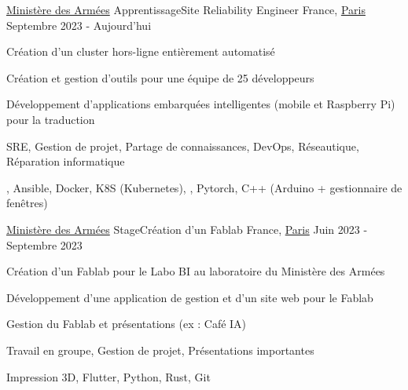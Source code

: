

\begin{cventries}

	\cventry
	{\href{https://www.defense.gouv.fr/}{Ministère des Armées}}
	{Apprentissage{\enskip\cdotp\enskip}Site Reliability Engineer} %
	{France, \href{https://www.paris.fr/}{Paris}} %
	{Septembre 2023 - Aujourd'hui} %
	{
		\begin{cvitems} %
			\item {Création d'un cluster hors-ligne entièrement automatisé}
			\item {Création et gestion d'outils pour une équipe de 25 développeurs}
			\item {Développement d'applications embarquées intelligentes (mobile et Raspberry Pi) pour la traduction}
		\end{cvitems}
	}
	{
		\begin{cvitemsskills} %
			\item {SRE, Gestion de projet, Partage de connaissances, DevOps, Réseautique, Réparation informatique}
			\item {\linux, Ansible, Docker, K8S (Kubernetes), \python, Pytorch, C++ (Arduino + gestionnaire de fenêtres)}
		\end{cvitemsskills}
	}

	\cventry
	{\href{https://www.defense.gouv.fr/}{Ministère des Armées}}
    {Stage{\enskip\cdotp\enskip}Création d'un Fablab} %
	{France, \href{https://www.paris.fr/}{Paris}} %
	{Juin 2023 - Septembre 2023} %
	{
		\begin{cvitems} %
			\item {Création d'un Fablab pour le Labo BI au laboratoire du Ministère des Armées}
			\item {Développement d'une application de gestion et d'un site web pour le Fablab}
			\item {Gestion du Fablab et présentations (ex : Café IA)}
		\end{cvitems}
	}
	{
		\begin{cvitemsskills} %
			\item {Travail en groupe, Gestion de projet, Présentations importantes}
			\item {Impression 3D, Flutter, Python, Rust, Git}
		\end{cvitemsskills}
	}


\end{cventries}
